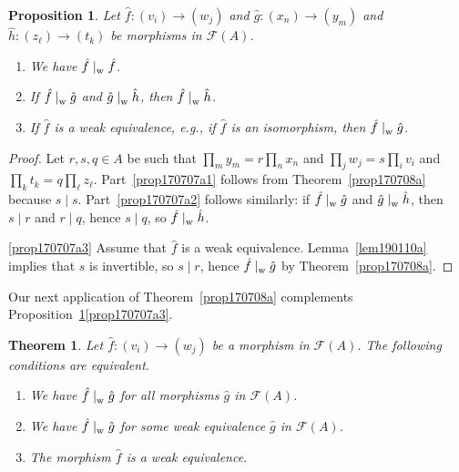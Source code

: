 \documentclass[reqno]{amsart}
\theoremstyle{plain}
\newtheorem{prop}[lem]{Proposition}
\newtheorem{thm}[lem]{Theorem}
\theoremstyle{definition}
\newcommand{\cat}[1]{\mathcal{#1}}
\newcommand{\catf}{\cat{F}}
\numberwithin{equation}{lem}
\newcommand{\divs}{\mid_{\text w}^{}}
\begin{document}
\begin{prop}\label{prop170707a}
Let
$\hat f\colon (v_i)\to(w_j)$ and $\hat g\colon (x_n)\to(y_m)$ and $\hat h\colon (z_\ell)\to(t_k)$
be morphisms in $\catf(A)$.
\begin{enumerate}[\rm(a)]
\item \label{prop170707a1}
We have $\hat f\divs\hat f$.
\item \label{prop170707a2}
If $\hat f\divs\hat g$ and $\hat g\divs\hat h$, then $\hat f\divs\hat h$.
\item \label{prop170707a3}
If $\hat f$ is a weak equivalence, e.g., if $\hat f$ is an isomorphism, then $\hat f\divs\hat g$. 
\end{enumerate}
\end{prop}

\begin{proof}
Let $r,s,q\in A$ be such that $\prod_my_m=r\prod_nx_n$ and $\prod_jw_j=s\prod_iv_i$ and $\prod_kt_k=q\prod_\ell z_\ell$.
Part~\eqref{prop170707a1}
follows from Theorem~\ref{prop170708a} because $s\mid s$.
Part~\eqref{prop170707a2} follows similarly: if $\hat f\divs\hat g$ and $\hat g\divs\hat h$, then 
$s\mid r$ and $r\mid q$, hence $s\mid q$, so $\hat f\divs\hat h$.


\eqref{prop170707a3}
Assume that $\hat f$ is a weak equivalence.
Lemma~\ref{lem190110a} implies that $s$ is invertible, so $s\mid r$,
hence $\hat f\divs\hat g$ by Theorem~\ref{prop170708a}.
\end{proof}

Our next  application of Theorem~\ref{prop170708a}
complements Proposition~\ref{prop170707a}\eqref{prop170707a3}.

\begin{thm}\label{prop170708b}
Let
$\hat f\colon (v_i)\to(w_j)$ 
be a morphism  in $\catf(A)$.
The following conditions are equivalent.
\begin{enumerate}[\rm(i)]
\item \label{prop170708b2a}
We have 
$\hat f\divs\hat g$ for all morphisms $\hat g$ in $\catf(A)$.
\item \label{prop170708b2b}
We have 
$\hat f\divs\hat g$ for some weak equivalence $\hat g$ in $\catf(A)$.
\item \label{prop170708b2c}
The morphism $\hat f$ is a weak equivalence.
\end{enumerate}
\end{thm}
\end{document}
